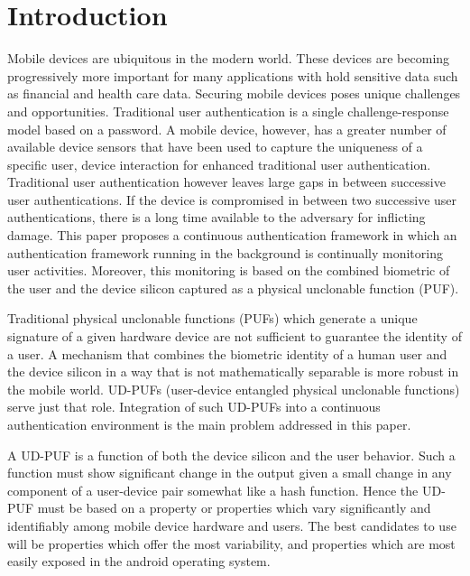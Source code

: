 \documentclass{acm_proc_article-sp}
\begin{document}
\section{Introduction}
\label{sec:intro}
Mobile devices are ubiquitous in the modern world. These devices are becoming progressively more important for many applications with hold sensitive data such as financial and health care data. 
Securing mobile devices poses unique challenges and opportunities. Traditional user authentication
is a single challenge-response model based on a password. 
 A mobile device, however, has a greater number of available device sensors that have been
used to capture the uniqueness of a specific user, device interaction for enhanced traditional
user authentication. Traditional user authentication however leaves large gaps in between successive
user authentications. If the device is compromised in between two successive user authentications,
there is a long time available to the adversary for inflicting damage. This paper proposes a
continuous authentication framework in which an authentication framework running in the background 
is continually monitoring user activities. Moreover, this monitoring is based on the 
combined biometric of the user and the device silicon captured as a physical unclonable function (PUF).
%

 Traditional physical unclonable functions (PUFs) which generate a unique signature of a given hardware device are not sufficient to guarantee the identity of a user.
A mechanism that combines the biometric identity of a human user and the device silicon in 
a way that is not mathematically separable is more robust in the mobile world. UD-PUFs (user-device
entangled physical unclonable functions) \cite{ScheelTyagi15} serve just that role.
Integration of such UD-PUFs into a continuous authentication environment is the main problem
addressed in this paper.


A UD-PUF is a function of both the device silicon and the user behavior. Such a function must show 
significant change in the output given a small change in any component of a user-device pair
somewhat like a hash function. Hence the UD-PUF must be based on a property or properties which vary significantly and identifiably among mobile device hardware and users. The best candidates to use will be properties which offer the most variability, and properties which are most easily exposed in the android operating system.
\end{document}
